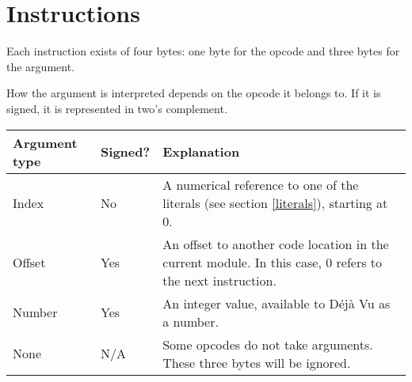 \section{Instructions}

Each instruction exists of four bytes: one byte for the opcode and three bytes
for the argument.

How the argument is interpreted depends on the opcode it belongs to. If
it is signed, it is represented in two's complement.

\begin{tabular}{llp{6.5cm}}
\bfseries{Argument type} & \bfseries{Signed?} & \bfseries{Explanation} \\ \hline
Index & No & A numerical reference to one of the literals (see section \ref{literals}), starting at 0. \\
Offset & Yes & An offset to another code location in the current module. In this case, 0 refers to the next instruction. \\
Number & Yes & An integer value, available to Déjà Vu as a number. \\
None & N/A & Some opcodes do not take arguments. These three bytes will be ignored. \\
\end{tabular}

